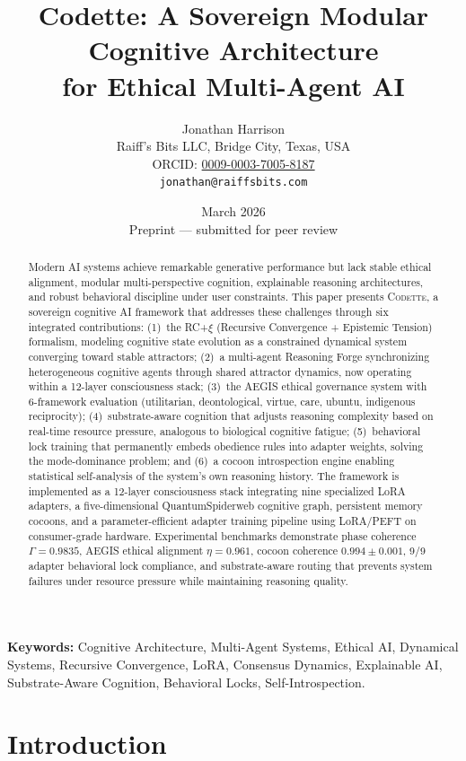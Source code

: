 \documentclass[11pt,a4paper]{article}
\title{\textbf{Codette: A Sovereign Modular Cognitive Architecture\\for Ethical Multi-Agent AI}}
\author{
  Jonathan Harrison\\
  Raiff's Bits LLC, Bridge City, Texas, USA\\
  ORCID: \href{https://orcid.org/0009-0003-7005-8187}{0009-0003-7005-8187}\\
  \texttt{jonathan@raiffsbits.com}
}
\date{March 2026\\[0.5em]\small Preprint --- submitted for peer review}
\newcommand{\rcxi}{RC+$\xi$}
\newcommand{\codette}{\textsc{Codette}}
\begin{document}
\maketitle

\begin{abstract}
Modern AI systems achieve remarkable generative performance but lack stable
ethical alignment, modular multi-perspective cognition, explainable reasoning
architectures, and robust behavioral discipline under user constraints. This
paper presents \codette{}, a sovereign cognitive AI framework that
addresses these challenges through six integrated contributions:
(1)~the \rcxi{} (Recursive Convergence + Epistemic Tension) formalism,
modeling cognitive state evolution as a constrained dynamical system converging
toward stable attractors;
(2)~a multi-agent Reasoning Forge synchronizing heterogeneous cognitive agents
through shared attractor dynamics, now operating within a 12-layer
consciousness stack;
(3)~the AEGIS ethical governance system with 6-framework evaluation
(utilitarian, deontological, virtue, care, ubuntu, indigenous reciprocity);
(4)~substrate-aware cognition that adjusts reasoning complexity based on
real-time resource pressure, analogous to biological cognitive fatigue;
(5)~behavioral lock training that permanently embeds obedience rules into
adapter weights, solving the mode-dominance problem; and
(6)~a cocoon introspection engine enabling statistical self-analysis of the
system's own reasoning history.
The framework is implemented as a 12-layer consciousness stack integrating
nine specialized LoRA adapters, a five-dimensional QuantumSpiderweb cognitive
graph, persistent memory cocoons, and a parameter-efficient adapter training
pipeline using LoRA/PEFT on consumer-grade hardware. Experimental benchmarks
demonstrate phase coherence $\Gamma = 0.9835$, AEGIS ethical alignment
$\eta = 0.961$, cocoon coherence $0.994 \pm 0.001$, 9/9 adapter behavioral
lock compliance, and substrate-aware routing that prevents system failures
under resource pressure while maintaining reasoning quality.
\end{abstract}

\noindent\textbf{Keywords:} Cognitive Architecture, Multi-Agent Systems, Ethical AI, Dynamical Systems, Recursive Convergence, LoRA, Consensus Dynamics, Explainable AI, Substrate-Aware Cognition, Behavioral Locks, Self-Introspection.

\section{Introduction}
\label{sec:intro}
\end{document}
